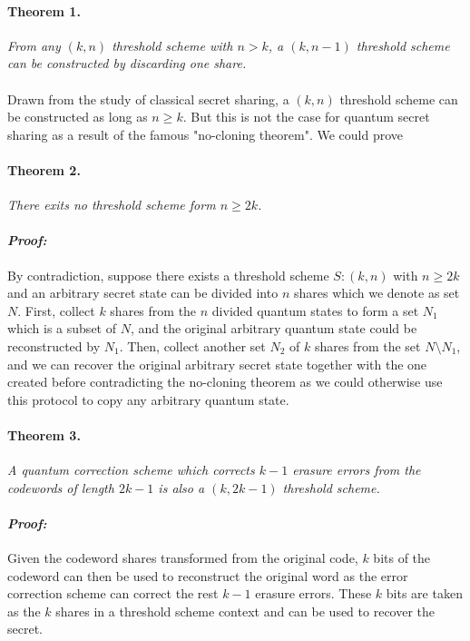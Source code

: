 \documentclass[12pt]{article}
\begin{document}
\paragraph{Theorem 1.}
\textit{From any $(k,n)$ threshold scheme with $n > k$, a $(k, n-1)$ threshold scheme can be constructed by discarding one share.}  \\ \\
Drawn from the study of classical secret sharing, a $(k,n)$ threshold scheme can be constructed as long as $n \ge k$. But this is not the case for quantum secret sharing as a result of the famous "no-cloning theorem". We could prove 
\paragraph{Theorem 2.}
\textit{There exits no threshold scheme form $n \ge 2k $.}
\paragraph{\textit{Proof:}}
By contradiction, suppose there exists a threshold scheme $S:(k, n)$ with $n \ge 2k$ and an arbitrary secret state can be divided into $n$ shares which we denote as set $N$.
First, collect $k$ shares from the $n$ divided quantum states to form a set $N_1$ which is a subset of $N$, and the original arbitrary quantum state could be reconstructed by $N_1$.
Then, collect another set $N_2$ of $k$ shares from the set $N \setminus N_1$, and we can recover the original arbitrary secret state together with the one created before contradicting the no-cloning theorem as we could otherwise use this protocol to copy any arbitrary quantum state.
\paragraph{Theorem 3.}
\textit{A quantum correction scheme which corrects $k-1$ erasure errors from the codewords of length $2k-1$ is also a $(k,2k-1)$ threshold scheme.}
\paragraph{\textit{Proof:}}
Given the codeword shares transformed from the original code, $k$ bits of the codeword can then be used to reconstruct the original word as the error correction scheme can correct the rest $k-1$ erasure errors. These $k$ bits are taken as the $k$ shares in a threshold scheme context and can be used to recover the secret.
\end{document}
